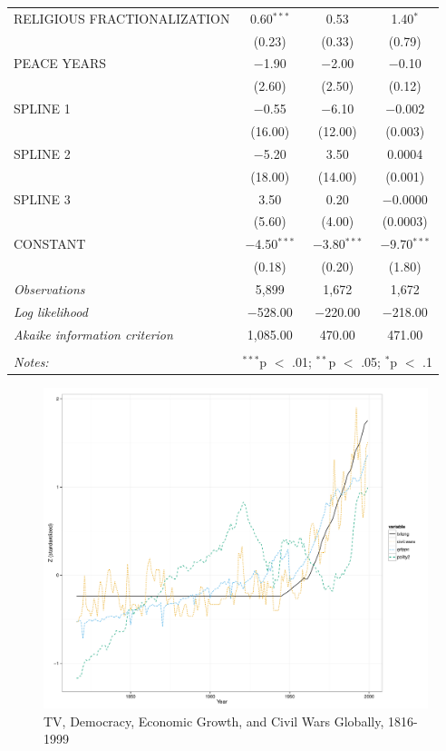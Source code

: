 \documentclass[11pt,article,oneside]{memoir}
\makeatletter
\def\maxwidth{\ifdim\Gin@nat@width>\linewidth\linewidth
\else\Gin@nat@width\fi}
\let\Oldincludegraphics\includegraphics
\renewcommand{\includegraphics}[1]{\Oldincludegraphics[width=\maxwidth]{#1}}
\makeatother
\begin{document}
\begin{table}[!htbp]
\begin{tabular}{@{\extracolsep{5pt}}lccc}
  RELIGIOUS FRACTIONALIZATION & 0.60$^{***}$ & 0.53 & 1.40$^{*}$ \\ 
  & (0.23) & (0.33) & (0.79) \\ 
  PEACE YEARS & $-$1.90 & $-$2.00 & $-$0.10 \\ 
  & (2.60) & (2.50) & (0.12) \\ 
  SPLINE 1 & $-$0.55 & $-$6.10 & $-$0.002 \\ 
  & (16.00) & (12.00) & (0.003) \\ 
  SPLINE 2 & $-$5.20 & 3.50 & 0.0004 \\ 
  & (18.00) & (14.00) & (0.001) \\ 
  SPLINE 3 & 3.50 & 0.20 & $-$0.0000 \\ 
  & (5.60) & (4.00) & (0.0003) \\ 
  CONSTANT & $-$4.50$^{***}$ & $-$3.80$^{***}$ & $-$9.70$^{***}$ \\ 
  & (0.18) & (0.20) & (1.80) \\ 
 \textit{Observations} & 5,899 & 1,672 & 1,672 \\ 
\textit{Log likelihood} & $-$528.00 & $-$220.00 & $-$218.00 \\ 
\textit{Akaike information criterion} & 1,085.00 & 470.00 & 471.00 \\ 
\hline \\[-1.8ex] 
\textit{Notes:} & \multicolumn{3}{l}{$^{***}$p $<$ .01; $^{**}$p $<$ .05; $^{*}$p $<$ .1} \\ 
\end{tabular} 
\end{table}

\begin{figure}[htbp]
\centering
\includegraphics{figure/longrunplot.pdf}
\caption{TV, Democracy, Economic Growth, and Civil Wars Globally,
1816-1999}
\end{figure}
\end{document}
